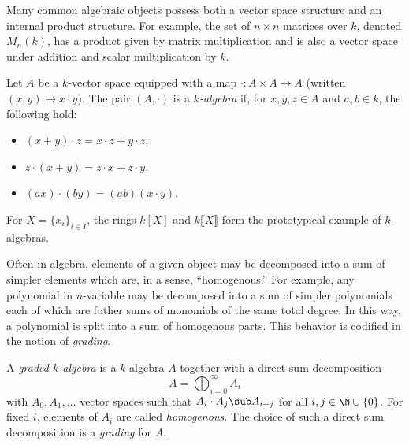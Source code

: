 \documentclass[12pt]{article}
\begin{document}
Many common algebraic objects possess both a vector space structure and an internal product structure. For example, the set of $ n\times n $ matrices over $ k $, denoted $ M_{n}(k) $, has a product given by matrix multiplication and is also a vector space under addition and scalar multiplication by $ k $. 

\begin{definition}\label{def:kalg}
  Let $ A $ be a $ k $-vector space equipped with a map $ \cdot: A\times A\to A $ (written $ (x,y)\mapsto x\cdot y $). The pair $ (A,\cdot) $ is a \textit{$ k $-algebra} if, for $ x,y,z\in A $ and $ a,b\in k $, the following hold:
  \begin{itemize}
    \item $(x+y)\cdot z = x\cdot z + y\cdot z$,
    \item $z\cdot (x+y) = z\cdot x + z\cdot y$,
    \item $(a x) \cdot (b y) = (a b)(x\cdot y)$.
  \end{itemize}
\end{definition}

\begin{keyexample*}\label{ex:poly}
  For $ X= \{x_{i}\}_{i\in I} $, the rings $ k[X] $ and $ k\llbracket X \rrbracket $ form the prototypical example of $ k $-algebras.
\end{keyexample*}

Often in algebra, elements of a given object may be decomposed into a sum of simpler elements which are, in a sense, ``homogenous.'' For example, any polynomial in $ n $-variable may be decomposed into a sum of simpler polynomials each of which are futher sums of monomials of the same total degree.  In this way, a polynomial is split into a sum of homogenous parts. This behavior is codified in the notion of \textit{grading}.

\begin{definition}\label{def:gralg}
A \textit{graded $ k $-algebra} is a $ k $-algebra $ A $ together with a direct sum decomposition
\[
  A = \bigoplus_{i=0}^{\infty} A_{i}
\]
with $ A_{0},A_{1},\ldots $ vector spaces such that $ A_{i}\cdot A_{j}\sub A_{i+j} $ for all $ i,j\in \N\cup\{0\} $. For fixed $ i $, elements of $ A_{i} $ are called \textit{homogenous}. The choice of such a direct sum decomposition is a \textit{grading} for $ A $.
\end{definition}
\end{document}
